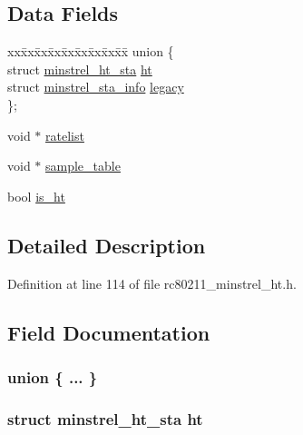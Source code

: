\subsection*{Data Fields}
\begin{DoxyCompactItemize}
\item 
\begin{tabbing}
xx\=xx\=xx\=xx\=xx\=xx\=xx\=xx\=xx\=\kill
union \{\\
\>struct \hyperlink{structminstrel__ht__sta}{minstrel\_ht\_sta} \hyperlink{structminstrel__ht__sta__priv_a24192392c2f90bf320a245b4af1319bb}{ht}\\
\>struct \hyperlink{structminstrel__sta__info}{minstrel\_sta\_info} \hyperlink{structminstrel__ht__sta__priv_aa23bd315f4b740dbf665fd13992b2042}{legacy}\\
\}; \\

\end{tabbing}\item 
void $\ast$ \hyperlink{structminstrel__ht__sta__priv_ad4ac07580c58cd424321fd2e4a8cf800}{ratelist}
\item 
void $\ast$ \hyperlink{structminstrel__ht__sta__priv_a3e6baa12c7e2d9d85f9c06542a62063e}{sample\-\_\-table}
\item 
bool \hyperlink{structminstrel__ht__sta__priv_a691fcae1200883f0309751d54945e68b}{is\-\_\-ht}
\end{DoxyCompactItemize}


\subsection{Detailed Description}


Definition at line 114 of file rc80211\-\_\-minstrel\-\_\-ht.\-h.



\subsection{Field Documentation}
\hypertarget{structminstrel__ht__sta__priv_afc1ac45011cf2de47afc3333fe867466}{\subsubsection[{"@15}]{\setlength{\rightskip}{0pt plus 5cm}union \{ ... \} }}\label{structminstrel__ht__sta__priv_afc1ac45011cf2de47afc3333fe867466}
\hypertarget{structminstrel__ht__sta__priv_a24192392c2f90bf320a245b4af1319bb}{
\subsubsection[{ht}]{\setlength{\rightskip}{0pt plus 5cm}struct {\bf minstrel\-\_\-ht\-\_\-sta} ht}}\label{structminstrel__ht__sta__priv_a24192392c2f90bf320a245b4af1319bb}



